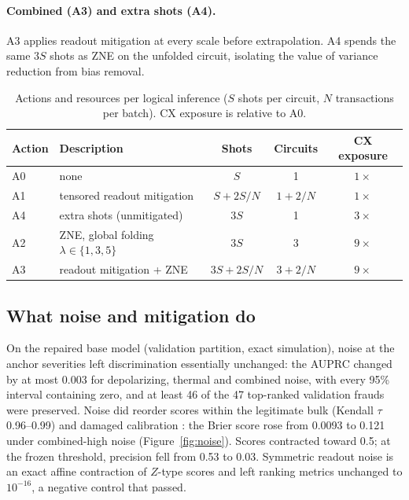 \documentclass[11pt]{article}
\begin{document}
\paragraph{Combined (A3) and extra shots (A4).}
A3 applies readout mitigation at every scale before extrapolation.
A4 spends the same $3S$ shots as ZNE on the unfolded circuit, isolating the value of variance reduction from bias removal.

\begin{table}[t]
\centering
\caption{Actions and resources per logical inference ($S$ shots per circuit, $N$ transactions per batch). CX exposure is relative to A0.}
\label{tab:actions}
\small
\begin{tabular}{llccc}
\toprule
Action & Description & Shots & Circuits & CX exposure \\
\midrule
A0 & none & $S$ & 1 & $1\times$ \\
A1 & tensored readout mitigation & $S + 2S/N$ & $1 + 2/N$ & $1\times$ \\
A4 & extra shots (unmitigated) & $3S$ & 1 & $3\times$ \\
A2 & ZNE, global folding $\lambda\in\{1,3,5\}$ & $3S$ & 3 & $9\times$ \\
A3 & readout mitigation + ZNE & $3S + 2S/N$ & $3 + 2/N$ & $9\times$ \\
\bottomrule
\end{tabular}
\end{table}

\subsection{What noise and mitigation do}
\label{sec:char}

On the repaired base model (validation partition, exact simulation), noise at the anchor severities left discrimination essentially unchanged: the AUPRC changed by at most 0.003 for depolarizing, thermal and combined noise, with every 95\% interval containing zero, and at least 46 of the 47 top-ranked validation frauds were preserved.
Noise did reorder scores within the legitimate bulk (Kendall $\tau$ 0.96--0.99) and damaged calibration \citep{guo2017calibration}: the Brier score rose from 0.0093 to 0.121 under combined-high noise (Figure~\ref{fig:noise}).
Scores contracted toward 0.5; at the frozen threshold, precision fell from 0.53 to 0.03.
Symmetric readout noise is an exact affine contraction of $Z$-type scores and left ranking metrics unchanged to $10^{-16}$, a negative control that passed.
\end{document}
